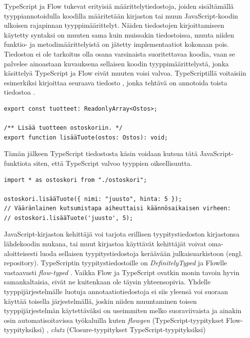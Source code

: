 TypeScript ja Flow tukevat erityisiä määrittelytiedostoja, joiden sisältämällä
tyyppiannotoidulla koodilla määritetään kirjaston tai muun JavaScript-koodin
ulkoisen rajapinnan tyyppimäärittelyt. Näiden tiedostojen kirjoittamiseen
käytetty syntaksi on muuten sama kuin muissakin tiedostoissa, muuta niiden funktio- ja
metodimäärittelyistä on jätetty implementaatiot kokonaan pois. Tiedoston ei
ole tarkoitus olla osana varsinaista suoritettavaa koodia, vaan se palvelee
ainoastaan kuvauksena sellaisen koodin tyyppimäärittelystä, jonka käsittelyä
TypeScript ja Flow eivät muuten voisi valvoa. TypeScriptillä voitaisiin
esimerkiksi kirjoittaa seuraava tiedosto , jonka
tehtävä on annotoida toista tiedostoa .
\begin{lstlisting}[caption={Esimerkki TypeScript määrittelytiedostosta ostoskori.d.ts}]
export const tuotteet: ReadonlyArray<Ostos>;

/** Lisää tuotteen ostoskoriin. */
export function lisääTuote(ostos: Ostos): void;
\end{lstlisting}
Tämän jälkeen TypeScript tiedostosta käsin voidaan kutsua tätä
JavaScript-funktiota siten, että TypeScript valvoo
tyyppien oikeellisuutta.
\begin{lstlisting}[caption={JavaScript-koodin kutsuminen TypeScript tiedostosta tuotesivu.ts}]
import * as ostoskori from "./ostoskori";

ostoskori.lisääTuote({ nimi: "juusto", hinta: 5 });
// Vääränlainen kutsumistapa aiheuttaisi käännösaikaisen virheen:
// ostoskori.lisääTuote('juusto', 5);
\end{lstlisting}
JavaScript-kirjaston kehittäjä voi tarjota erillisen tyypitystiedoston
kirjastonsa lähdekoodin mukana, tai muut kirjastoa käyttävät kehittäjät
voivat oma-aloitteisesti luoda sellaisen tyypitystiedostoja keräävään
julkaisuarkistoon (engl. repository).
TypeScriptin tyy\-pi\-tys\-tie\-dos\-toil\-le
on \textit{DefinitelyTyped} \cite{DefinitelyTyped} ja Flowlle
vastaavasti \textit{flow-typed} \cite{FlowTyped}. Vaikka Flow ja TypeScript
ovatkin monin tavoin hyvin samankaltaisia, eivät ne kuitenkaan ole täysin
yhteensopivia. Yhdelle tyyppijärjestelmälle luotuja annotaatiotiedostoja
ei siis yleensä voi suoraan käyttää toisella järjestelmällä, joskin niiden
muuntaminen toisen tyyppijärjestelmän käytettäväksi on useimmiten melko
suoraviivaista ja ainakin osin automatisoitavissa työkaluilla kuten
\textit{flowgen} (TypeScript-tyypitykset Flow-tyypityksiksi) \cite{Flowgen},
\textit{clutz}  (Closure-tyypitykset TypeScript-tyypityksiksi) \cite{Clutz}
